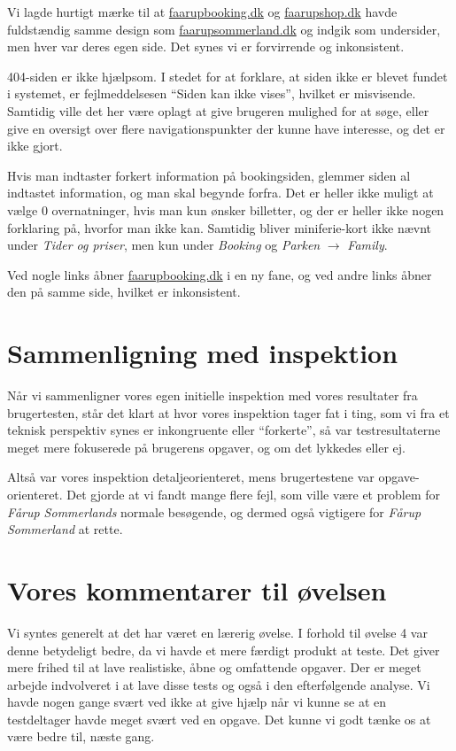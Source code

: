 \documentclass[10pt,a4paper]{article}      %
\begin{document}
Vi lagde hurtigt mærke til at \url{faarupbooking.dk} og \url{faarupshop.dk} havde
fuldstændig samme design som \url{faarupsommerland.dk} og indgik som undersider, men hver
var deres egen side. Det synes vi er forvirrende og inkonsistent.

404-siden er ikke hjælpsom. I stedet for at forklare, at siden ikke er
blevet fundet i systemet, er fejlmeddelsesen ``Siden kan ikke vises'', hvilket er
misvisende. Samtidig ville det her være oplagt at give brugeren mulighed for at
søge, eller give en oversigt over flere navigationspunkter der kunne have
interesse, og det er ikke gjort.

Hvis man indtaster forkert information på bookingsiden, glemmer siden al
indtastet information, og man skal begynde forfra. Det er heller ikke muligt at
vælge 0 overnatninger, hvis man kun ønsker billetter, og der er heller ikke
nogen forklaring på, hvorfor man ikke kan. Samtidig bliver miniferie-kort
ikke nævnt under \emph{Tider og priser}, men kun under \emph{Booking} og
\emph{Parken} $\rightarrow$ \emph{Family}.

Ved nogle links åbner \url{faarupbooking.dk} i en ny fane, og ved andre links
åbner den på samme side, hvilket er inkonsistent.

\section{Sammenligning med inspektion}
\label{apx:sammenligning-inspektion}

Når vi sammenligner vores egen initielle inspektion med vores resultater fra
brugertesten, står det klart at hvor vores inspektion tager fat i ting, som vi
fra et teknisk perspektiv synes er inkongruente eller ``forkerte'', så var
testresultaterne meget mere fokuserede på brugerens opgaver, og om det
lykkedes eller ej.

Altså var vores inspektion detaljeorienteret, mens brugertestene var
opgave-orienteret. Det gjorde at vi fandt mange flere fejl, som ville være et
problem for \emph{Fårup Sommerlands} normale besøgende, og dermed også
vigtigere for \emph{Fårup Sommerland} at rette.

\section{Vores kommentarer til øvelsen}
\label{apx:vores-kommentarer}

Vi syntes generelt at det har været en lærerig øvelse. I forhold til øvelse 4 var denne betydeligt bedre, da vi havde et mere færdigt produkt at teste. Det giver mere frihed til at lave realistiske, åbne og omfattende opgaver. Der er meget arbejde indvolveret i at lave disse tests og også i den efterfølgende analyse. Vi havde nogen gange svært ved ikke at give hjælp når vi kunne se at en testdeltager havde meget svært ved en opgave. Det kunne vi godt tænke os at være bedre til, næste gang. 
\end{document}
